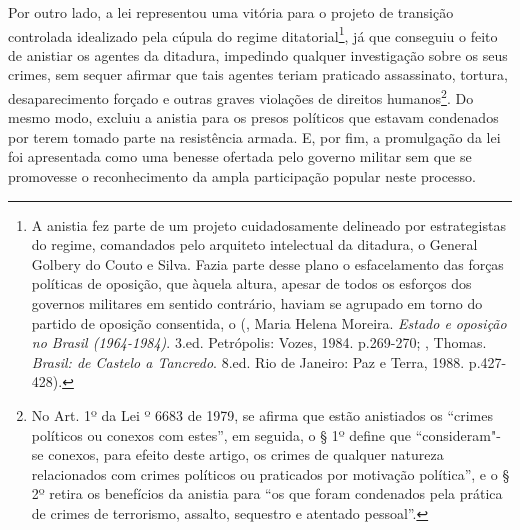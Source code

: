 Por outro lado, a lei representou uma vitória para o projeto de
transição controlada idealizado pela cúpula do regime
ditatorial\footnote{A anistia fez parte de um projeto cuidadosamente
  delineado por estrategistas do regime, comandados pelo arquiteto
  intelectual da ditadura, o General Golbery do Couto e Silva. Fazia
  parte desse plano o esfacelamento das forças políticas de oposição,
  que àquela altura, apesar de todos os esforços dos governos militares
  em sentido contrário, haviam se agrupado em torno do partido de
  oposição consentida, o  (, Maria Helena Moreira.
  \emph{Estado e oposição no Brasil (1964-1984)}. 3.ed. Petrópolis:
  Vozes, 1984. p.269-270; , Thomas. \emph{Brasil: de Castelo
  a Tancredo}. 8.ed. Rio de Janeiro: Paz e Terra, 1988. p.427-428).}, já
que conseguiu o feito de anistiar os agentes da ditadura, impedindo
qualquer investigação sobre os seus crimes, sem sequer afirmar que tais
agentes teriam praticado assassinato, tortura, desaparecimento forçado e
outras graves violações de direitos humanos\footnote{No Art. 1º da Lei
  º 6683 de 1979, se afirma que estão anistiados os ``crimes políticos
  ou conexos com estes'', em seguida, o § 1º define que ``consideram"-se
      conexos, para efeito deste artigo, os crimes de qualquer natureza
      relacionados com crimes políticos ou praticados por motivação
      política'', e o § 2º retira os benefícios da anistia para ``os que foram
              condenados pela prática de crimes de terrorismo, assalto, sequestro e
              atentado pessoal''.}. Do mesmo modo, excluiu a anistia para os presos
políticos que estavam condenados por terem tomado parte na resistência
armada. E, por fim, a promulgação da lei foi apresentada como uma
benesse ofertada pelo governo militar sem que se promovesse o
reconhecimento da ampla participação popular neste processo.

